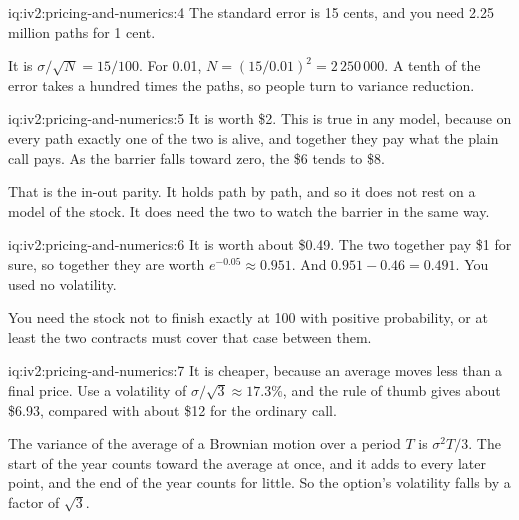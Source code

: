 \begin{solution}{iq:iv2:pricing-and-numerics:4}
The standard error is 15 cents, and you need 2.25 million paths for 1 cent.

It is $\sigma/\sqrt N = 15/100$. For 0.01, $N = (15/0.01)^2 = 2\,250\,000$. A tenth of the error takes a hundred times the paths, so people turn to variance reduction.

\end{solution}

\begin{solution}{iq:iv2:pricing-and-numerics:5}
It is worth \$2. This is true in any model, because on every path exactly one of the two is alive, and together they pay what the plain call pays. As the barrier falls toward zero, the \$6 tends to \$8.

That is the in-out parity. It holds path by path, and so it does not rest on a model of the stock. It does need the two to watch the barrier in the same way.

\end{solution}

\begin{solution}{iq:iv2:pricing-and-numerics:6}
It is worth about \$0.49. The two together pay \$1 for sure, so together they are worth $e^{-0.05} \approx 0.951$. And $0.951 - 0.46 = 0.491$. You used no volatility.

You need the stock not to finish exactly at 100 with positive probability, or at least the two contracts must cover that case between them.

\end{solution}

\begin{solution}{iq:iv2:pricing-and-numerics:7}
It is cheaper, because an average moves less than a final price. Use a volatility of $\sigma/\sqrt 3 \approx 17.3\%$, and the rule of thumb gives about \$6.93, compared with about \$12 for the ordinary call.

The variance of the average of a Brownian motion over a period $T$ is $\sigma^2T/3$. The start of the year counts toward the average at once, and it adds to every later point, and the end of the year counts for little. So the option's volatility falls by a factor of $\sqrt 3$.

\end{solution}

